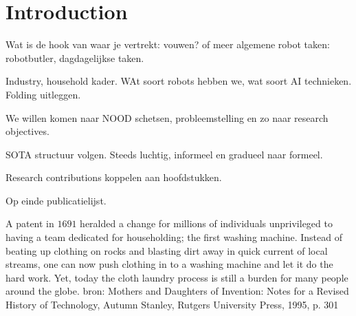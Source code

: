 \documentclass[\home/main.tex]{subfiles}
\begin{document}

\chapter{Introduction}\label{ch:introduction}

Wat is de hook van waar je vertrekt: vouwen? of meer algemene robot taken: robotbutler, dagdagelijkse taken.

Industry, household kader.
WAt soort robots hebben we, wat soort AI technieken. 
Folding uitleggen. 

We willen komen naar 
    NOOD schetsen, probleemstelling
    en zo naar research objectives. 


SOTA structuur volgen. Steeds luchtig, informeel en gradueel naar formeel.

Research contributions koppelen aan hoofdstukken. 

Op einde publicatielijst. 


A patent in $1691$ heralded a change for millions of individuals unprivileged to having a team dedicated for householding; the first washing machine. Instead of beating up clothing on rocks and blasting dirt away in quick current of local streams, one can now push clothing in to a washing machine and let it do the hard work. Yet, today the cloth laundry process is still a burden for many people around the globe. 
    bron: Mothers and Daughters of Invention: Notes for a Revised History of Technology, Autumn Stanley, Rutgers University Press, 1995, p. 301
\end{document}
